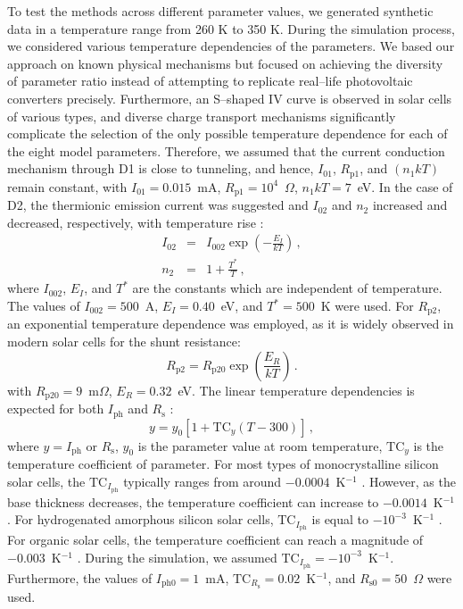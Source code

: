 \documentclass[a4paper,fleqn]{cas-dc}
\begin{document}
To test the methods across different parameter values, we generated synthetic data in a temperature range from 260 K to 350 K.
During the simulation process, we considered various temperature dependencies of the parameters.
We based our approach on known physical mechanisms but focused on achieving the diversity of parameter ratio
instead of attempting to replicate real--life photovoltaic converters precisely.
Furthermore, an S--shaped IV curve is observed in solar cells of various types,
and diverse charge transport mechanisms significantly complicate the selection of
the only possible temperature dependence for each of the eight model parameters.
Therefore, we assumed that the current conduction mechanism through D1 is close to tunneling,
and hence, $I_{01}$, $R_\mathrm{p1}$, and $(n_1kT)$ remain constant,
with $I_{01}=0.015$~mA, $R_\mathrm{p1}=10^4$~$\Omega$, $n_1kT=7$~eV.
In the case of D2, the thermionic emission current was suggested
and $I_{02}$ and $n_2$ increased and decreased, respectively, with temperature rise \cite{Sze2012}:
\begin{eqnarray}
I_{02}&=& I_{002}\exp\left(-\frac{E_I}{kT}\right)\,,\\
n_2&=&1+\frac{T^*}{T}\,,
\end{eqnarray}
where $I_{002}$, $E_I$, and $T^*$ are the constants which are independent of temperature.
The values of $I_{002}=500$~A, $E_I=0.40$~eV, and $T^*=500$~K were used.
For $R_\mathrm{p2}$, an exponential temperature dependence was employed,
as it is widely observed \cite{Kondratenko2019} in modern solar cells for the shunt resistance:
\begin{equation}
R_\mathrm{p2}=R_\mathrm{p20}\exp\left(\frac{E_R}{kT}\right)\,.
\end{equation}
with
$R_\mathrm{p20}=9$~m$\Omega$,
$E_R=0.32$~eV.
The linear temperature dependencies is expected for both $I_\mathrm{ph}$ \cite{Green2003,Eberle2021} and $R_\mathrm{s}$ \cite{Ibrahim2017,Bradaschia2019}:
\begin{equation}
y=y_{0}[1+\mathrm{TC}_y(T-300)]\,,
\end{equation}
where
$y=I_\mathrm{ph}$ or $R_\mathrm{s}$,
$y_0$ is the parameter value at room temperature,
$\mathrm{TC}_y$ is the temperature coefficient of parameter.
For most types of monocrystalline silicon solar cells, the $\mathrm{TC}_{I_\mathrm{ph}}$ typically ranges from around $-0.0004$~K$^{-1}$ \cite{TuanLe2021}.
However, as the base thickness decreases, the temperature coefficient can increase to $-0.0014$~K$^{-1}$ \cite{Dupre2016}.
For hydrogenated amorphous silicon solar cells, $\mathrm{TC}_{I_\mathrm{ph}}$ is equal to $-10^{-3}$~K$^{-1}$ \cite{Riesen2016}.
For organic solar cells, the temperature coefficient can reach a magnitude of $-0.003$~K$^{-1}$ \cite{Rana2018}.
During the simulation, we assumed $\mathrm{TC}_{I_\mathrm{ph}}=-10^{-3}$~K$^{-1}$.
Furthermore, the values of $I_\mathrm{ph0}=1$~mA,
$\mathrm{TC}_{R_\mathrm{s}}=0.02$~K$^{-1}$,
and $R_\mathrm{s0}=50$~$\Omega$ were used.
\end{document}
